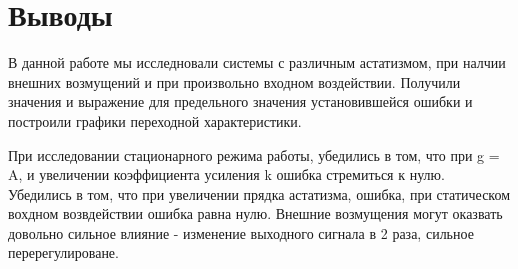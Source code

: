 \documentclass[a4paper, 11pt]{article}
\begin{document}
\section*{Выводы}
В данной работе мы исследновали системы с различным астатизмом, при налчии внешних возмущений и при произвольно входном воздействии. Получили значения и выражение для предельного значения установившейся ошибки и построили графики переходной характеристики. \par
При исследовании стационарного режима работы, убедились в том, что при g = A, и увеличении коэффициента усиления k ошибка стремиться к нулю. 
Убедились в том, что при увеличении прядка астатизма, ошибка, при статическом вохдном возвдействии ошибка равна нулю.
Внешние возмущения могут оказвать довольно сильное влияние - изменение выходного сигнала в 2 раза, сильное перерегулироване.
\end{document}
